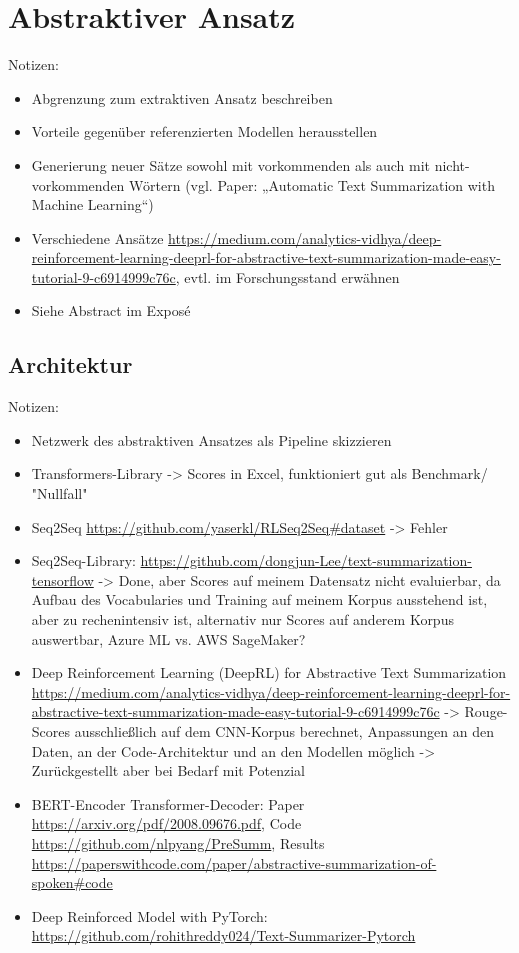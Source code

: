 \chapter{Abstraktiver Ansatz}
\thispagestyle{fancy}
\label{chap:Abstraktiver Ansatz}

Notizen:
\begin{itemize}
	\item Abgrenzung zum extraktiven Ansatz beschreiben
	\item Vorteile gegenüber referenzierten Modellen herausstellen
	\item Generierung neuer Sätze sowohl mit vorkommenden als auch mit nicht-vorkommenden Wörtern (vgl. Paper: „Automatic Text Summarization with Machine Learning“)
	\item Verschiedene Ansätze \url{https://medium.com/analytics-vidhya/deep-reinforcement-learning-deeprl-for-abstractive-text-summarization-made-easy-tutorial-9-c6914999c76c}, evtl. im Forschungsstand erwähnen
	\item Siehe Abstract im Exposé
\end{itemize}


\section{Architektur}
Notizen:
\begin{itemize}
	\item Netzwerk des abstraktiven Ansatzes als Pipeline skizzieren
	\item Transformers-Library -> Scores in Excel, funktioniert gut als Benchmark/ "Nullfall"
	\item Seq2Seq \url{https://github.com/yaserkl/RLSeq2Seq#dataset} -> Fehler
	\item Seq2Seq-Library: \url{https://github.com/dongjun-Lee/text-summarization-tensorflow} -> Done, aber Scores auf meinem Datensatz nicht evaluierbar, da Aufbau des Vocabularies und Training auf meinem Korpus ausstehend ist, aber zu rechenintensiv ist, alternativ nur Scores auf anderem Korpus auswertbar, Azure ML vs. AWS SageMaker?
	\item Deep Reinforcement Learning (DeepRL) for Abstractive Text Summarization \url{https://medium.com/analytics-vidhya/deep-reinforcement-learning-deeprl-for-abstractive-text-summarization-made-easy-tutorial-9-c6914999c76c} -> Rouge-Scores ausschließlich auf dem CNN-Korpus berechnet, Anpassungen an den Daten, an der Code-Architektur und an den Modellen möglich -> Zurückgestellt aber bei Bedarf mit Potenzial
	\item BERT-Encoder Transformer-Decoder: Paper \url{https://arxiv.org/pdf/2008.09676.pdf}, Code \url{https://github.com/nlpyang/PreSumm}, Results \url{https://paperswithcode.com/paper/abstractive-summarization-of-spoken#code}
	\item Deep Reinforced Model with PyTorch: \url{https://github.com/rohithreddy024/Text-Summarizer-Pytorch}
\end{itemize}


